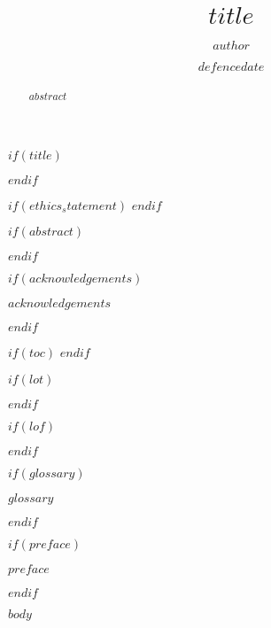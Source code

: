 \documentclass{sfuthesis}
\title{$title$}
\author{$author$}
\date{$defencedate$}
\begin{document}
\raggedright


\frontmatter


$if(title)$
  \maketitle
$endif$


\makecommittee{}


$if(ethics_statement)$
	\clearpage
$endif$


$if(abstract)$
  \begin{abstract}
    $abstract$
  \end{abstract}
$endif$

% 


$if(acknowledgements)$
  \begin{acknowledgements}
    $acknowledgements$
  \end{acknowledgements}
$endif$


$if(toc)$
	\hypersetup{linkcolor=$if(toccolor)$$toccolor$$else$black$endif$}
	\setcounter{tocdepth}{$toc-depth$}
	\tableofcontents
	\clearpage
$endif$


$if(lot)$
	\listoftables
	\clearpage
$endif$


$if(lof)$
	\listoffigures
	\clearpage
$endif$


$if(glossary)$
  \begin{glossary}
    $glossary$
  \end{glossary}
$endif$


$if(preface)$
  \begin{preface}
    $preface$
  \end{preface}
$endif$




%
%

\mainmatter


$body$
\end{document}
